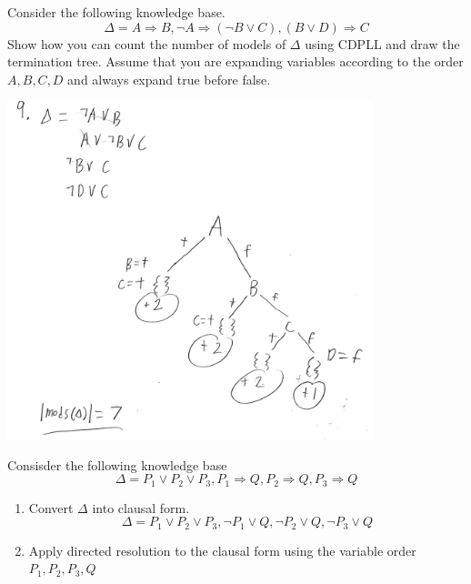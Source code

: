 \documentclass[11pt]{exam}
\begin{document}
\begin{questions}
\question[12] Consider the following knowledge base.
$$\Delta = A \Rightarrow B, \lnot A \Rightarrow (\lnot B \lor C), (B \lor D) \Rightarrow C$$
Show how you can count the number of models of $\Delta$ using CDPLL and draw the termination tree. Assume that you are expanding variables according to the order $A,B,C,D$ and always expand true before false.
\begin{center}
\includegraphics[width=0.8\textwidth]{src/q9.png}
\end{center}
\newpage

\question[14] Consisder the following knowledge base
$$\Delta = P_1 \lor P_2 \lor P_3, P_1 \Rightarrow Q, P_2 \Rightarrow Q, P_3 \Rightarrow Q$$
\begin{enumerate}[label={\alph*}]
    \item Convert $\Delta$ into clausal form.$$\Delta = P_1 \lor P_2 \lor P_3, \lnot P_1 \lor Q, \lnot P_2 \lor Q, \lnot P_3 \lor Q$$
    \item Apply directed resolution to the clausal form using the variable order $P_1,P_2,P_3,Q$
    \vspace{1em}


\end{enumerate}
\end{questions}
\end{document}
